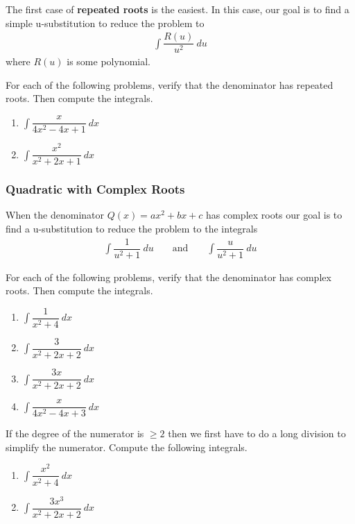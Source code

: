 The first case of {\bf repeated roots} is the easiest. In this case, our goal is to find a simple u-substitution to reduce the problem to
\begin{align*}
	\int \dfrac{R(u)}{u^2} \: du
\end{align*}
where $R(u)$ is some polynomial.
\begin{exercise}
	For each of the following problems, verify that the denominator has repeated roots. Then
	compute the integrals.
	\begin{multicols}{2}
		\begin{enumerate}
			\item $ \int \dfrac{x}{4x^2 - 4x + 1} \: dx$
			\item $ \int \dfrac{x^2}{x^2 + 2x + 1} \: dx$
		\end{enumerate}
	\end{multicols}
\end{exercise}

\subsubsection*{Quadratic with Complex Roots}
When the denominator $Q(x) = ax^2 + bx + c$ has complex roots our goal is to find a u-substitution to reduce the problem to the integrals
\begin{align*}
	\int \dfrac{1}{u^2 + 1} \: du
	 &  & \mbox{ and }
	 &  &
	\int \dfrac{u}{u^2 + 1} \: du
\end{align*}

\begin{exercise}
	For each of the following problems, verify that the denominator has complex roots. Then
	compute the integrals.
	\begin{multicols}{2}
		\begin{enumerate}
			\item $ \int \dfrac{1}{x^2 + 4} \: dx$
			\item $ \int \dfrac{3}{x^2 + 2x + 2} \: dx$
			\item $ \int \dfrac{3x}{x^2 + 2x + 2} \: dx$
			\item $ \int \dfrac{x}{4x^2 - 4x + 3} \: dx$
		\end{enumerate}
	\end{multicols}
\end{exercise}

\begin{exercise}If the degree of the numerator is $ \ge 2$ then we first have to do a long division to simplify the numerator. Compute the following integrals.
	\begin{multicols}{2}
		\begin{enumerate}
			\item $ \int \dfrac{x^2}{x^2 + 4} \: dx$
			\item $ \int \dfrac{3x^3}{x^2 + 2x + 2} \: dx$
		\end{enumerate}
	\end{multicols}
\end{exercise}



